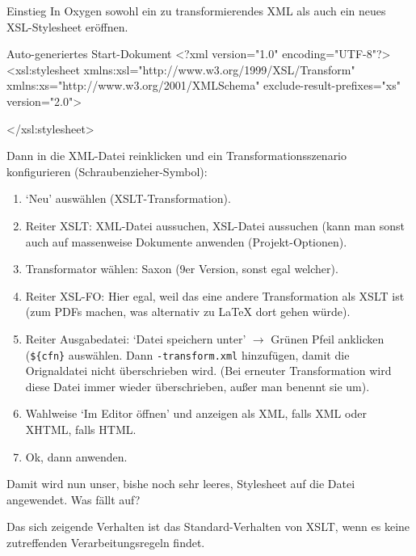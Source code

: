 \begin{frame}{Einstieg}
In Oxygen sowohl ein zu transformierendes XML als auch ein neues XSL-Stylesheet eröffnen.

\begin{myxml}{Auto-generiertes Start-Dokument}
<?xml version="1.0" encoding="UTF-8"?>
<xsl:stylesheet xmlns:xsl="http://www.w3.org/1999/XSL/Transform"
    xmlns:xs="http://www.w3.org/2001/XMLSchema"
    exclude-result-prefixes="xs"
    version="2.0">
    
</xsl:stylesheet>
\end{myxml}
\framebreak

Dann in die XML-Datei reinklicken und ein Transformationsszenario konfigurieren (Schraubenzieher-Symbol):
\begin{enumerate}\footnotesize
    \item `Neu' auswählen (XSLT-Transformation).
    \item Reiter XSLT: XML-Datei aussuchen, XSL-Datei aussuchen (kann man sonst auch auf massenweise Dokumente anwenden (Projekt-Optionen).
    \item Transformator wählen: Saxon (9er Version, sonst egal welcher).
    \item Reiter XSL-FO: Hier egal, weil das eine andere Transformation als XSLT ist (zum PDFs machen, was alternativ zu \LaTeX{} dort gehen würde).
    \item Reiter Ausgabedatei: `Datei speichern unter' $\to$ Grünen Pfeil anklicken (\verb|${cfn}| auswählen. Dann \texttt{-transform.xml} hinzufügen, damit die Orignaldatei nicht überschrieben wird. (Bei erneuter Transformation wird diese Datei immer wieder überschrieben, außer man benennt sie um).
    \item Wahlweise `Im Editor öffnen' und anzeigen als XML, falls XML oder XHTML, falls HTML.
    \item Ok, dann anwenden.
\end{enumerate}

Damit wird nun unser, bishe noch sehr leeres, Stylesheet auf die Datei angewendet. \alert{ Was fällt auf? }

Das sich zeigende Verhalten ist das Standard-Verhalten von XSLT, wenn es keine zutreffenden Verarbeitungsregeln findet.
\end{frame}


